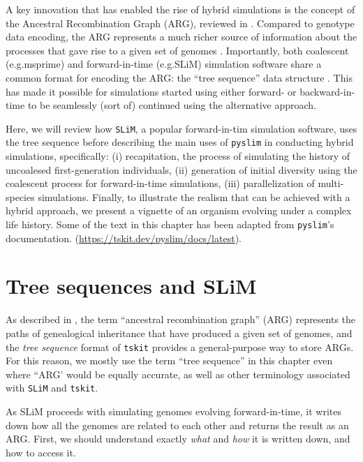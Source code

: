 \documentclass[12pt]{article}
\newcommand{\tskit}[0]{\texttt{tskit}\xspace}
\newcommand{\slim}[0]{\texttt{SLiM}\xspace}
\newcommand{\pyslim}[0]{\texttt{pyslim}\xspace}
\newcommand*{\eg}{e.g.\xcomma}
\begin{document}
A key innovation that has enabled the rise of hybrid simulations is the concept of the Ancestral Recombination Graph (ARG), reviewed in \citet{wong_general_2024}.
Compared to genotype data encoding, the ARG represents a much richer source of information about the processes that gave rise
to a given set of genomes \citep{kelleher_efficient_2016}.
Importantly, both coalescent (\eg msprime) and forward-in-time (\eg SLiM) simulation software share a common format for
encoding the ARG: the ``tree sequence'' data structure \citep{baumdicker_efficient_2022, haller_tree-sequence_2019}.
This has made it possible for simulations started using either forward- or backward-in-time
to be seamlessly (sort of) continued using the alternative approach.

Here, we will review how \slim, a popular forward-in-tim simulation software, uses the tree sequence before describing
the main uses of \pyslim in conducting hybrid simulations, specifically:
(i) recapitation, the process of simulating the history of uncoalesed first-generation individuals,
(ii) generation of initial diversity using the coalescent process for forward-in-time simulations,
(iii) parallelization of multi-species simulations.
Finally, to illustrate the realism that can be achieved with a hybrid approach, we present a vignette of an organism evolving under a complex life history.
Some of the text in this chapter has been adapted from \pyslim's documentation.
(\url{https://tskit.dev/pyslim/docs/latest}).

\section{Tree sequences and SLiM}
As described in \citet{wong_general_2024}, the term ``ancestral recombination graph'' (ARG)
represents the paths of genealogical inheritance that have produced a given set of genomes,
and the \emph{tree sequence} format of \tskit provides a general-purpose way to store ARGs.
For this reason, we mostly use the term ``tree sequence'' in this chapter even where ``ARG'
would be equally accurate, as well as other terminology associated with \slim and \tskit \citet{kelleher_efficient_2016,ralph_efficiently_2020,wong_general_2024}.

As SLiM proceeds with simulating genomes evolving forward-in-time, it writes down
how all the genomes are related to each other and returns the result as an ARG.
First, we should understand exactly \emph{what} and \emph{how} it is written down, and how to access it.
\end{document}
